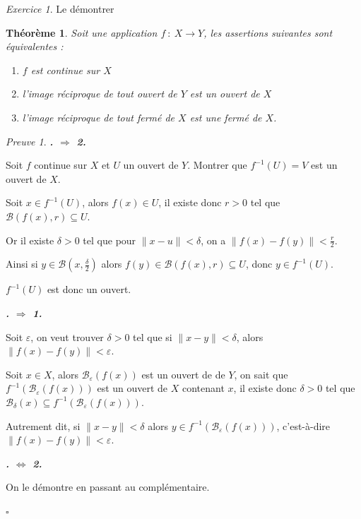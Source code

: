 \documentclass[]{article}
\newtheorem{mythm}{Théorème}
\theoremstyle{remark}
\newtheorem{myexer}{Exercice}
\newtheorem{myproof}{Preuve}
\theoremstyle{definition}
\newcommand{\cqfd}{
	\hfill$\square$
}
\newenvironment{proofpart}[1]{
	\leavevmode
	
	\noindent
	{\textit{\textbf{\boldmath #1}}}
	
}{
	\checkmark
}
\begin{document}
\begin{myexer}
	Le démontrer
\end{myexer}

\begin{mythm}
	Soit une application $f~:~X \longrightarrow Y$, les assertions suivantes sont équivalentes :
	\begin{enumerate}
	 \item $f$ est continue sur $X$
	 \item l'image réciproque de tout ouvert de $Y$ est un ouvert de $X$
	 \item l'image réciproque de tout fermé de $X$ est une fermé de $X$.
 	\end{enumerate}
\end{mythm}

\begin{myproof}
	\begin{proofpart}{1. $\Longrightarrow$ 2.}
		Soit $f$ continue sur $X$ et $U$ un ouvert de $Y$. Montrer que $f^{-1}(U)=V$ est un ouvert de $X$.
		
		Soit $x \in f^{-1}(U)$, alors $f(x) \in U$, il existe donc $r>0$ tel que $\mathcal{B}(f(x), r) \subseteq U$.
		
		Or il existe $\delta > 0$ tel que pour $\|x-u\| < \delta$, on a $\|f(x)-f(y)\| < \frac{r}{2}$.
		
		Ainsi si $y \in \mathcal{B}\left(x, \frac{\delta}{2}\right)$ alors $f(y) \in \mathcal{B}(f(x), r) \subseteq U$, donc $y \in f^{-1}(U)$.
		
		$f^{-1}(U)$ est donc un ouvert.
	\end{proofpart}
	
	\begin{proofpart}{2. $\Longrightarrow$ 1.}
		Soit $\varepsilon$, on veut trouver $\delta > 0$ tel que si $\|x-y\| < \delta$, alors $\|f(x)-f(y)\| < \varepsilon$.
	
		Soit $x \in X$, alors $\mathcal{B}_\varepsilon(f(x))$ est un ouvert de de $Y$, on sait que $f^{-1}(\mathcal{B}_\varepsilon(f(x)))$ est un ouvert de $X$ contenant $x$, il existe donc $\delta > 0$ tel que $\mathcal{B}_\delta(x) \subseteq f^{-1}(\mathcal{B}_\varepsilon(f(x)))$.
		
		Autrement dit, si $\|x-y\| < \delta$ alors $y \in f^{-1}(\mathcal{B}_\varepsilon(f(x)))$, c'est-à-dire $\|f(x)-f(y)\| < \varepsilon$.
	\end{proofpart}
	
	\begin{proofpart}{1. $\Longleftrightarrow$ 2.}
		On le démontre en passant au complémentaire.
	\end{proofpart}
	
	\cqfd
\end{myproof}
\end{document}
